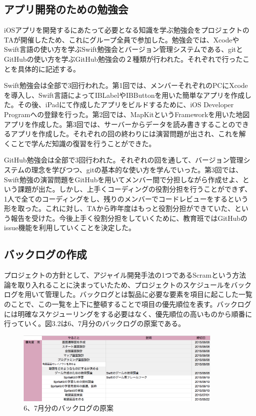 \documentclass[openany,11pt,papersize]{jsbook}
\begin{document}
\subsection{アプリ開発のための勉強会}
\par iOSアプリを開発するにあたって必要となる知識を学ぶ勉強会をプロジェクトのTAが開催したため、これにグループ全員で参加した。勉強会では、XcodeやSwift言語の使い方を学ぶSwift勉強会とバージョン管理システムである、gitとGitHubの使い方を学ぶGitHub勉強会の２種類が行われた。それぞれで行ったことを具体的に記述する。
\par Swift勉強会は全部で3回行われた。第1回では、メンバーそれぞれのPCにXcodeを導入し、Swift言語によってIBLabelやIBButtonを用いた簡単なアプリを作成した。その後、iPadにて作成したアプリをビルドするために、iOS Developer Programへの登録を行った。第2回では、MapKitというFrameworkを用いた地図アプリを作成した。第3回では、サーバーからデータを読み書きすることのできるアプリを作成した。それぞれの回の終わりには演習問題が出され、これを解くことで学んだ知識の復習を行うことができた。
\par GitHub勉強会は全部で3回行われた。それぞれの回を通して、バージョン管理システムの理念を学びつつ、gitの基本的な使い方を学んでいった。第3回では、Swift勉強の演習問題をGitHubを用いてメンバー間で分担しながら作成せよ、という課題が出た。しかし、上手くコーディングの役割分担を行うことができず、1人で全てのコーディングをし、残りのメンバーでコードレビューをするという形を取った。これに対し、TAから昨年度はもっと役割分担ができていた、という報告を受けた。今後上手く役割分担をしていくために、教育班ではGitHubのissue機能を利用していくことを決定した。

\subsection{バックログの作成}
\par プロジェクトの方針として、アジャイル開発手法の1つであるScramという方法論を取り入れることに決まっていたため、プロジェクトのスケジュールをバックログを用いて管理した。バックログとは製品に必要な要素を項目に起こした一覧のことで、この一覧を上下に整頓することで項目の優先順位を表す。バックログには明確なスケジューリングをする必要はなく、優先順位の高いものから順番に行っていく。図3.2は6、7月分のバックログの原案である。

\begin{figure}[H]
\begin{center}
\includegraphics[width=10cm, bb=0 0 1020 359]{img/SprintBacklog.png}
\end{center}
\caption{6、7月分のバックログの原案}
\end{figure}
\end{document}

